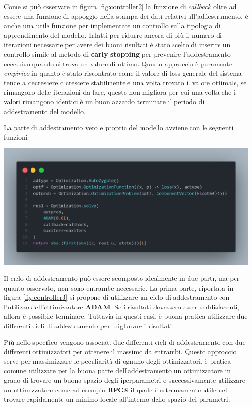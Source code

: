 Come si può osservare in figura \ref{fig:controller2} la funzione di \emph{callback} oltre ad essere una funzione di 
appoggio nella stampa dei dati relativi all'addestramento, è anche una utile funzione per implementare un controllo sulla tipologia 
di apprendimento del modello. Infatti per ridurre ancora di più il numero di iterazioni necessarie per avere dei buoni risultati 
è stato scelto di inserire un controllo simile al metodo di \textbf{early stopping} \cite{wiki:Early_stopping} per prevenire 
l'addestramento eccessivo quando si trova un valore di ottimo. Questo approccio è puramente \emph{empirico} in quanto 
è stato riscontrato come il valore di loss generale del sistema tende a decrescere o crescere stabilmente e una volta trovato il 
valore ottimale, se rimangono delle iterazioni da fare, questo non migliora per cui una volta che i valori rimangono identici 
è un buon azzardo terminare il periodo di addestramento del modello.

La parte di addestramento vero e proprio del modello avviene con le seguenti funzioni

\begin{minipage}{\linewidth}
	\centering
	\includegraphics[width=\textwidth]{img/controller3.png}
	\label{fig:controller3}
\end{minipage}

Il ciclo di addestramento può essere scomposto idealmente in due parti, ma per quanto osservato, non sono 
entrambe necessarie. La prima parte, riportata in figura \ref{fig:controller3} si propone di utilizzare un ciclo di addestramento 
con l'utilizzo dell'ottimizzatore \textbf{ADAM}. Se i risultati dovessero esser soddisfacenti, allora è possibile terminare. 
Tuttavia in questi casi, è buona pratica utilizzare due differenti cicli di addestramento per migliorare i risultati. 

Più nello specifico vengono associati due differenti cicli di addestramento con due differenti ottimizzatori per ottenere il massimo 
da entrambi. Questo approccio serve per massimizzare le peculiarità di ognuno degli ottimizzatori. è pratica comune utilizzare per la 
buona parte dell'addestramento un ottimizzatore in grado di trovare un buono spazio degli iperparametri e successivamente utilizzare 
un ottimizzatore come ad esempio \textbf{BFGS} \cite{10.1093/imamat/6.1.76} \cite{35d0019d-775a-3628-b0b4-67be112e346b} \cite{10.1093/comjnl/13.3.317} \cite{e3177091-3094-3792-9d61-0ab445735ddb}
il quale è estremamente utile nel trovare rapidamente un minimo locale all'interno dello spazio dei parametri.

